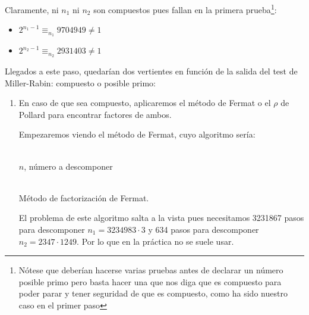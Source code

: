 \begin{enumerate}
		Claramente, ni $n_1$ ni $n_2$ son compuestos pues fallan en la primera prueba\footnote{Nótese que deberían
		hacerse varias pruebas antes de declarar un número posible primo pero basta hacer una que nos diga que es
		compuesto para poder parar y tener seguridad de que es compuesto, como ha sido nuestro caso en el primer
		paso}:
		\begin{itemize}
			\item $2^{n_1-1} \equiv_{n_1} 9704949 \neq 1$
			\item $2^{n_2-1} \equiv_{n_2} 2931403 \neq 1$
		\end{itemize}
		
		Llegados a este paso, quedarían dos vertientes en función de la salida del test de Miller-Rabin: compuesto
		o posible primo:
		
		\begin{enumerate}
			\item En caso de que sea compuesto, aplicaremos el método de Fermat o el $\rho$ de Pollard para
			encontrar factores de ambos.
			
			Empezaremos viendo el método de Fermat, cuyo algoritmo sería:
			\begin{algorithm}[H]
			\begin{algorithmic}[1]
				\REQUIRE \ \\
					\texttt{$n$}, número a descomponer \\ \
				\ELSE
						\ENDIF
					\ENDWHILE
				\ENDIF
			\end{algorithmic}
			\caption{Método de factorización de Fermat.}
			\label{Fermat-factors}
			\end{algorithm}
			
			El problema de este algoritmo salta a la vista pues necesitamos 3231867 pasos para descomponer
			$n_1 = 3234983 \cdot 3$ y 634 pasos para descomponer $n_2 = 2347 \cdot 1249$. Por lo que en la
			práctica no se suele usar.
			

\end{enumerate}
\end{enumerate}
